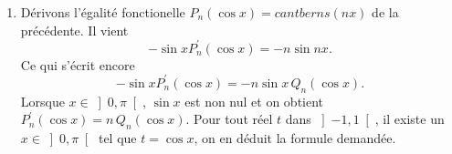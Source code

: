 \begin{enumerate}
\item  D{\'e}rivons l'égalité fonctionelle $P_n(\cos x) = cantberns (nx)$ de la pr{\'e}c{\'e}dente. Il vient
\[
-\sin xP_{n}^{\prime }(\cos x)=-n\sin nx.
\]
Ce qui s'{\'e}crit encore
\[
-\sin xP_{n}^{\prime }(\cos x)=-n\sin x\,Q_{n}(\cos x).
\]
Lorsque $x\in \left] 0,\pi \right[ $, $\sin x$ est non nul et on obtient $ P_{n}^{\prime }(\cos x)=n\,Q_{n}(\cos x)$. Pour tout r{\'e}el $t$ dans $\left] -1,1\right[ $, il existe un $x\in \left] 0,\pi \right[ $ tel que $t=\cos x$, on en d{\'e}duit la formule demand{\'e}e.
\end{enumerate}
